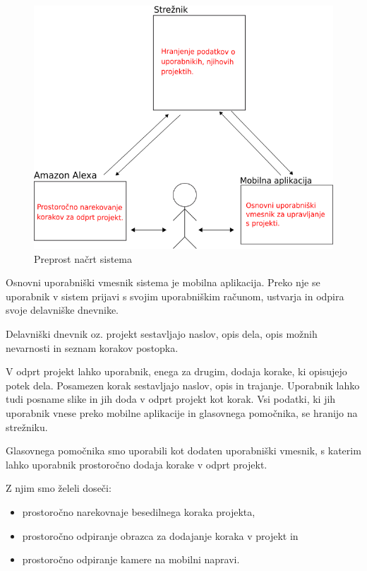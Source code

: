 \documentclass[a4paper, 12pt]{book}
\begin{document}
\begin{figure}[H]
\begin{center}
\includegraphics[width=13cm]{plan_simple}
\end{center}
\caption{Preprost načrt sistema}
\label{plan_simple}
\end{figure}


Osnovni uporabniški vmesnik sistema je mobilna aplikacija.
Preko nje se uporabnik v sistem prijavi s svojim uporabniškim računom, ustvarja in odpira svoje delavniške dnevnike.

Delavniški dnevnik oz. projekt sestavljajo naslov, opis dela, opis možnih nevarnosti in seznam korakov postopka.

V odprt projekt lahko uporabnik, enega za drugim, dodaja korake, ki opisujejo potek dela.
Posamezen korak sestavljajo naslov, opis in trajanje.
Uporabnik lahko tudi posname slike in jih doda v odprt projekt kot korak.
Vsi podatki, ki jih uporabnik vnese preko mobilne aplikacije in glasovnega pomočnika, se hranijo na strežniku.

Glasovnega pomočnika smo uporabili kot dodaten uporabniški vmesnik, s katerim lahko uporabnik prostoročno dodaja korake v odprt projekt.

\noindent Z njim smo želeli doseči:
\begin{itemize}
	\item prostoročno narekovnaje besedilnega koraka projekta,
	\item prostoročno odpiranje obrazca za dodajanje koraka v projekt in
	\item prostoročno odpiranje kamere na mobilni napravi.
\end{itemize}
\end{document}
